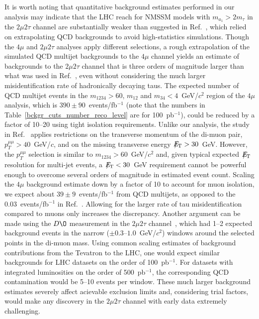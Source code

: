 \documentclass[aps,prl,twocolumn,nofootinbib,superscriptaddress]{revtex4}
\begin{document}
It is worth noting that quantitative background estimates performed in
our analysis may indicate that the LHC reach for NMSSM models with
$m_{a_1} > 2m_\tau$ in the $2\mu 2\tau$ channel are substantially
weaker than suggested in Ref.~\cite{2mu2tau-pheno}, which relied on
extrapolating QCD backgrounds to avoid high-statistics simulations.
Though the $4\mu$ and $2\mu 2\tau$ analyses apply different
selections, a rough extrapolation of the simulated QCD multijet
backgrounds to the $4\mu$ channel yields an estimate of backgrounds to
the $2\mu 2\tau$ channel that is three orders of magnitude larger than
what was used in Ref.~\cite{2mu2tau-pheno}, even without considering
the much larger misidentification rate of hadronically decaying taus.
The expected number of QCD multijet events in the $m_{1234} > 60$,
$m_{12}$ and $m_{34} < 4$~GeV/$c^2$ region of the $4\mu$ analysis,
which is $390 \pm 90$~events/fb$^{-1}$ (note that the numbers in
Table~\ref{bckgr_cuts_number_reco_level} are for 100~pb$^{-1}$), could
be reduced by a factor of 10--20 using tight isolation requirements.
Unlike our analysis, the study in Ref.~\cite{2mu2tau-pheno} applies
restrictions on the transverse momentum of the di-muon pair,
$p_T^{\mu\mu} > 40$~GeV/$c$, and on the missing transverse energy
$\mbox{${E\!\!\!\!/_{\rm T}}$} > 30$~GeV.  However, the $p_T^{\mu\mu}$ selection is similar to
$m_{1234} > 60$~GeV/$c^2$ and, given typical expected $\mbox{${E\!\!\!\!/_{\rm T}}$}$
resolution for multi-jet events, a $\mbox{${E\!\!\!\!/_{\rm T}}$} < 30$~GeV requirement cannot
be powerful enough to overcome several orders of magnitude in
estimated event count.  Scaling the $4\mu$ background estimate down by
a factor of 10 to account for muon isolation, we expect about $39 \pm
9$~events/fb$^{-1}$ from QCD multijets, as opposed to the
0.03~events/fb$^{-1}$ in Ref.~\cite{2mu2tau-pheno}.  Allowing for the
larger rate of tau misidentification compared to muons only increases
the discrepancy.  Another argument can be made using the $D\O$
measurement in the $2 \mu 2\tau$ channel~\cite{d0-low-ma}, which had
1--2 expected background events in the narrow ($\pm
0.3$--$1.0$~GeV/$c^2$) windows around the selected points in the
di-muon mass.  Using common scaling estimates of background
contributions from the Tevatron to the LHC, one would expect similar
backgrounds for LHC datasets on the order of 100~pb$^{-1}$.  For
datasets with integrated luminosities on the order of 500~pb$^{-1}$,
the corresponding QCD contamination would be 5--10 events per window.
These much larger background estimates severely affect acievable
exclusion limits and, considering trial factors, would make any
discovery in the $2\mu 2\tau$ channel with early data extremely
challenging.
\end{document}
